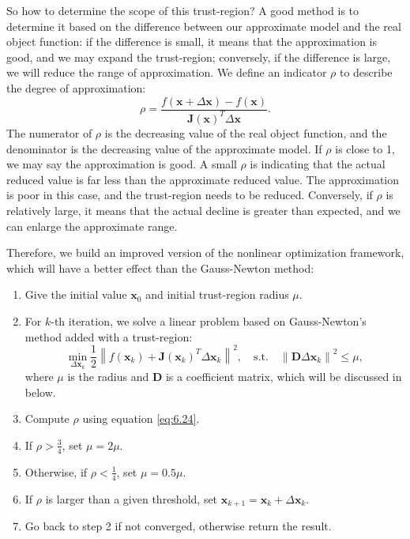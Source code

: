 So how to determine the scope of this trust-region? A good method is to determine it based on the difference between our approximate model and the real object function: if the difference is small, it means that the approximation is good, and we may expand the trust-region; conversely, if the difference is large, we will reduce the range of approximation. We define an indicator $\rho$ to describe the degree of approximation:
\begin{equation}\label{eq:6.24}
	\rho = \frac{{f\left( {\mathbf{x} + \Delta \mathbf{x}} \right)}-{{ {f\left( \mathbf{x} \right)} }}} {\mathbf{J}\left( \mathbf{x} \right)^T \Delta \mathbf{x}}.
\end{equation}
The numerator of $\rho$ is the decreasing value of the real object function, and the denominator is the decreasing value of the approximate model. If $\rho$ is close to 1, we may say the approximation is good. A small $\rho$ is indicating that the actual reduced value is far less than the approximate reduced value. The approximation is poor in this case, and the trust-region needs to be reduced. Conversely, if $\rho$ is relatively large, it means that the actual decline is greater than expected, and we can enlarge the approximate range.

Therefore, we build an improved version of the nonlinear optimization framework, which will have a better effect than the Gauss-Newton method:

\begin{mdframed}
	\begin{enumerate}
		\item Give the initial value $\mathbf{x}_0$ and initial trust-region radius $\mu$.
		\item For $k$-th iteration, we solve a linear problem based on Gauss-Newton's method added with a trust-region: 
		\begin{equation}\label{eq:LM}
			\mathop {\min }\limits_{\Delta \mathbf{x}_k} \frac{1}{2}{\left\| {f\left( \mathbf{x}_k \right) + \mathbf{J} \left( \mathbf{x}_k \right)^T \Delta \mathbf{x}_k} \right\|^2}, \quad \mathrm{s.t.}\quad {\left\| {\mathbf{D} \Delta \mathbf{x}_k} \right\|^2} \leqslant \mu ,
		\end{equation}
		where $\mu$ is the radius and $\mathbf{D}$ is a coefficient matrix, which will be discussed in below. 
		\item Compute $\rho$ using equation \eqref{eq:6.24}. 
		\item If $\rho > \frac{3}{4}$, set $\mu = 2 \mu$. 
		\item Otherwise, if $\rho < \frac{1}{4}$, set $\mu = 0.5 \mu$. 
		\item If $\rho$ is larger than a given threshold, set $\mathbf{x}_{k+1} = \mathbf{x}_k+\Delta \mathbf{x}_k$. 
		\item Go back to step 2 if not converged, otherwise return the result. 
	\end{enumerate}
\end{mdframed}

